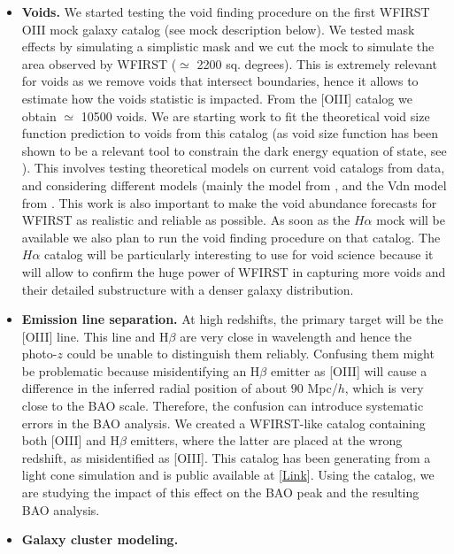 \begin{itemize}

\item {\bf Voids.} We started testing the void finding procedure on the first
WFIRST OIII mock galaxy catalog (see mock description below). We tested mask
effects by simulating a simplistic mask and we cut the mock to simulate the area
observed by WFIRST ($\simeq$ 2200 sq. degrees). This is extremely relevant for
voids as we remove voids that intersect boundaries, hence it allows to estimate
how the voids statistic is impacted. From the [OIII] catalog we obtain $\simeq$
10500 voids. We are starting work to fit the theoretical void size function
prediction to voids from this catalog (as void size function has been shown to
be a relevant tool to constrain the dark energy equation of state, see
\cite{Pisani2015}). This involves testing theoretical models on current void
catalogs from data, and considering different models (mainly the model from
\cite{Sheth2004}, and the Vdn model from  \cite{Jennings2013}. This work is also
important to make the void abundance forecasts for WFIRST as realistic and
reliable as possible. As soon as the $H\alpha$ mock will be available we also
plan to run the void finding procedure on that catalog. The $H\alpha$ catalog
will be particularly interesting to use for void science because it will allow
to confirm the huge power of WFIRST in capturing more voids and their detailed
substructure with a denser galaxy distribution.

\item {\bf Emission line separation.} At high redshifts, the primary target will
be the [OIII] line. This line and H$\beta$ are very close in wavelength and
hence the photo-$z$ could be unable to distinguish them reliably. Confusing them
might be problematic because misidentifying an H$\beta$ emitter as [OIII] will
cause a difference in the inferred radial position of about $90$ Mpc/$h$, which
is very close to the BAO scale. Therefore, the confusion can introduce
systematic errors in the BAO analysis. We created a WFIRST-like catalog
containing both [OIII] and H$\beta$ emitters, where the latter are placed at the
wrong redshift, as misidentified as [OIII]. This catalog has been generating
from a light cone simulation and is public available at
[\href{http://www.wfirst-hls-cosmology.org/products/}{Link}]. Using the catalog,
we are studying the impact of this effect on the BAO peak and the resulting BAO
analysis.

\item {\bf Galaxy cluster modeling. }


\end{itemize}
